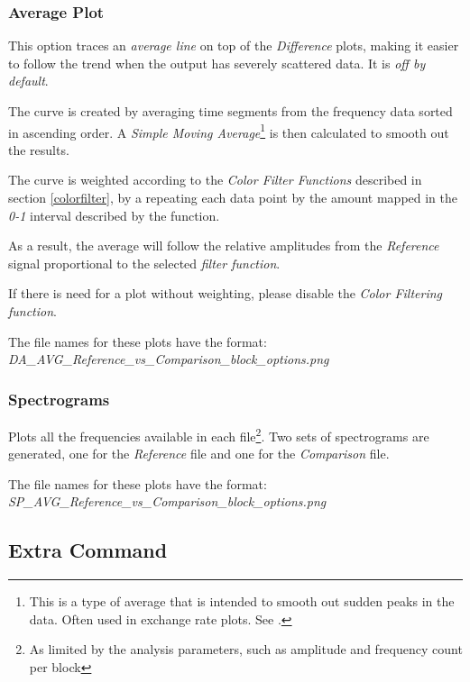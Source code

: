 \documentclass[10pt,a4paper]{report}
\begin{document}
\begin{appendices}
\subsubsection{Average Plot}
\label{averaged}

This option traces an \textit{average line} on top of the \textit{Difference} plots, making it easier to follow the trend when the output has severely scattered data. It is \textit{off by default}.

The curve is created by averaging time segments from the frequency data sorted in ascending order. A \textit{Simple Moving Average}\footnote{This is a type of average that is intended to smooth out sudden peaks in the data. Often used in exchange rate plots. See \cite{sma}.} is then calculated to smooth out the results.

The curve is weighted according to the \textit{Color Filter Functions} described in section \ref{colorfilter}, by a repeating each data point by the amount mapped in the \textit{0-1} interval described by the function.

As a result, the average will follow the relative amplitudes from the \textit{Reference} signal proportional to the selected \textit{filter function}.

If there is need for a plot without weighting, please disable the \textit{Color Filtering function}.

The file names for these plots have the format:\\ \textit{DA\_AVG\_Reference\_vs\_Comparison\_block\_options.png}

\subsubsection{Spectrograms}

Plots all the frequencies available in each file\footnote{As limited by the analysis parameters, such as amplitude and frequency count per block}. Two sets of spectrograms are generated, one for the \textit{Reference} file and one for the \textit{Comparison} file.

The file names for these plots have the format:\\ \textit{SP\_AVG\_Reference\_vs\_Comparison\_block\_options.png}

\subsection{Extra Command}
\label{extracommand}


\end{appendices}
\end{document}
